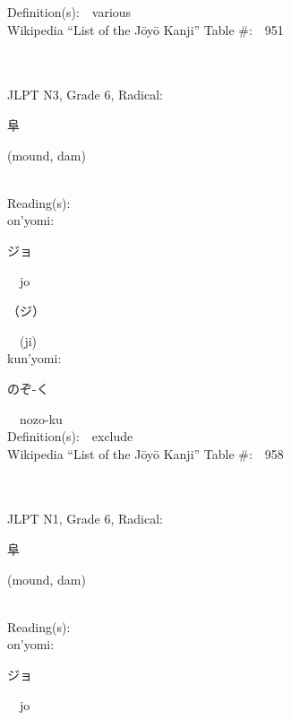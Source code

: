 \begin{multicols}{2}
Definition(s):\ \ various \\
Wikipedia ``List of the J\=oy\=o Kanji'' Table \#:\ \ 951 \\
\ \ \\
{\fontsize{34pt}{40pt}  }\ \ \\  %
{JLPT N3, Grade 6, Radical:\ \ {\begin{CJK}{UTF8}{min} 阜 \end{CJK}} (mound, dam) } \\
Reading(s):\ \ \\
{\hspace*{1em}}on'yomi:\ \ \\
{\hspace*{2em}}{\begin{CJK}{UTF8}{min} ジョ \end{CJK}}\ \ jo\ \ \\
{\hspace*{2em}}{\begin{CJK}{UTF8}{min} （ジ） \end{CJK}}\ \ (ji)\ \ \\
{\hspace*{1em}}kun'yomi:\ \ \\
{\hspace*{2em}}{\begin{CJK}{UTF8}{min} のぞ-く \end{CJK}}\ \ nozo-ku\ \ \\
Definition(s):\ \ exclude \\
Wikipedia ``List of the J\=oy\=o Kanji'' Table \#:\ \ 958 \\
\ \ \\
{\fontsize{34pt}{40pt}  }\ \ \\  %
{JLPT N1, Grade 6, Radical:\ \ {\begin{CJK}{UTF8}{min} 阜 \end{CJK}} (mound, dam) } \\
Reading(s):\ \ \\
{\hspace*{1em}}on'yomi:\ \ \\
{\hspace*{2em}}{\begin{CJK}{UTF8}{min} ジョ \end{CJK}}\ \ jo\ \ \\

\end{multicols}
